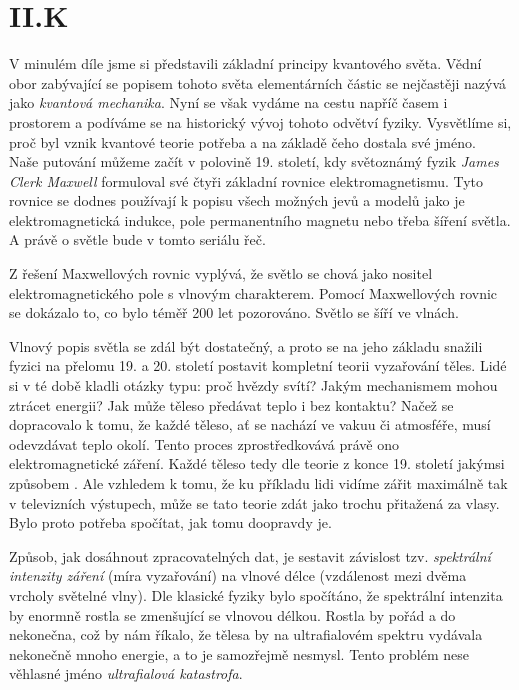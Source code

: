 \documentclass{../../../../style/mkimain}
\begin{document}
\section*{II.K }
V minulém díle jsme si představili základní principy kvantového světa.
Vědní obor zabývající se popisem tohoto světa elementárních částic se nejčastěji nazývá jako \textit{kvantová mechanika}.
Nyní se však vydáme na cestu napříč časem i prostorem a podíváme se na historický vývoj tohoto odvětví fyziky.
Vysvětlíme si, proč byl vznik kvantové teorie potřeba a na základě čeho dostala své jméno.
\\

Naše putování můžeme začít v polovině 19. století,
kdy světoznámý fyzik \textit{James Clerk Maxwell} formuloval své čtyři základní rovnice elektromagnetismu.
Tyto rovnice se dodnes používají k popisu všech možných jevů a modelů jako je elektromagnetická indukce,
pole permanentního magnetu nebo třeba šíření světla.
A právě o světle bude v tomto seriálu řeč.

Z řešení Maxwellových rovnic vyplývá, že světlo se chová jako nositel elektromagnetického pole s vlnovým charakterem.
Pomocí Maxwellových rovnic se dokázalo to, co bylo téměř 200 let pozorováno. Světlo se šíří ve vlnách.

Vlnový popis světla se zdál být dostatečný,
a proto se na jeho základu snažili fyzici na přelomu 19. a 20. století postavit kompletní teorii vyzařování těles.
Lidé si v té době kladli otázky typu: proč hvězdy svítí?
Jakým mechanismem mohou ztrácet energii? Jak může těleso předávat teplo i bez kontaktu? Načež se dopracovalo k tomu,
že každé těleso, ať se nachází ve vakuu či atmosféře, musí odevzdávat teplo okolí.
Tento proces zprostředkovává právě ono elektromagnetické záření.
Každé těleso tedy dle teorie z konce 19. století jakýmsi způsobem .
Ale vzhledem k tomu, že ku příkladu lidi vidíme zářit maximálně tak v televizních výstupech,
může se tato teorie zdát jako trochu přitažená za vlasy.
Bylo proto potřeba spočítat, jak tomu doopravdy je.

Způsob, jak dosáhnout zpracovatelných dat,
je sestavit závislost tzv. \textit{spektrální intenzity záření} (míra vyzařování) na vlnové délce (vzdálenost mezi dvěma vrcholy světelné vlny).
Dle klasické fyziky bylo spočítáno, že spektrální intenzita by enormně rostla se zmenšující se vlnovou délkou.
Rostla by pořád a do nekonečna, což by nám říkalo, že tělesa by na ultrafialovém spektru vydávala nekonečně mnoho energie,
a to je samozřejmě nesmysl.
Tento problém nese věhlasné jméno \textit{ultrafialová katastrofa}.
\end{document}
